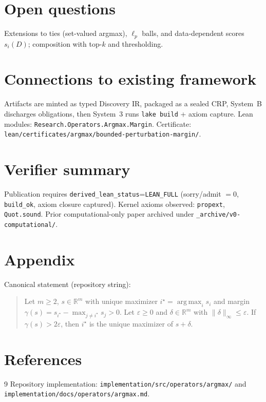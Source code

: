 \documentclass[11pt]{article}
\begin{document}
\section{Open questions}
Extensions to ties (set-valued argmax), \(\ell_p\) balls, and data-dependent
scores \(s_i(D)\); composition with top-\(k\) and thresholding.

\section{Connections to existing framework}
Artifacts are minted as typed Discovery IR, packaged as a sealed CRP, System~B
discharges obligations, then System~3 runs \texttt{lake build} + axiom capture.
Lean modules: \texttt{Research.Operators.Argmax.Margin}.
Certificate: \texttt{lean/certificates/argmax/bounded-perturbation-margin/}.

\section{Verifier summary}
Publication requires \texttt{derived\_lean\_status}=\texttt{LEAN\_FULL}
(sorry/admit \(=0\), \texttt{build\_ok}, axiom closure captured).
Kernel axioms observed: \texttt{propext}, \texttt{Quot.sound}.
Prior computational-only paper archived under
\texttt{\_archive/v0-computational/}.

\section{Appendix}
Canonical statement (repository string):
\begin{quote}\small
Let \(m\ge 2\), \(s\in\mathbb{R}^m\) with unique maximizer
\(i^\star=\operatorname*{arg\,max}_i s_i\) and margin
\(\gamma(s)=s_{i^\star}-\max_{j\neq i^\star}s_j>0\).
Let \(\varepsilon\ge 0\) and \(\delta\in\mathbb{R}^m\) with \(\|\delta\|_\infty\le\varepsilon\).
If \(\gamma(s)>2\varepsilon\), then \(i^\star\) is the unique maximizer of \(s+\delta\).
\end{quote}

\section*{References}
\begin{thebibliography}{9}
Repository implementation:
\texttt{implementation/src/operators/argmax/}
and \texttt{implementation/docs/operators/argmax.md}.
\end{thebibliography}
\end{document}
